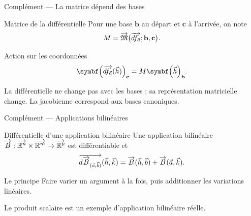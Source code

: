 \begin{frame}[t]{Complément — La matrice dépend des bases}
\coursanalyse
\begin{notion}{Matrice de la différentielle}
Pour une base $\mathbf b$ au départ et $\mathbf c$ à l'arrivée, on note
\[M=\overrightarrow{\mathfrak M}\bigl(\overrightarrow{df_{\vec a}};\mathbf b,\mathbf c\bigr).\]
\end{notion}
\begin{theoreme}{Action sur les coordonnées}
\[\coord{\df f{\vec a}(\vec h)}{\mathbf c}=M\coord{\vec h}{\mathbf b}.\]
\end{theoreme}
\vfill La différentielle ne change pas avec les bases ; sa représentation matricielle change. La jacobienne correspond aux bases canoniques.
\end{frame}

\begin{frame}[t]{Complément — Applications bilinéaires}
\coursanalyse
\begin{theoreme}{Différentielle d'une application bilinéaire}
Une application bilinéaire $\overrightarrow{B}:\overrightarrow{\mathbb R^{n}}\times\overrightarrow{\mathbb R^{m}}\to\overrightarrow{\mathbb R^{p}}$ est différentiable et
\[\overrightarrow{d\overrightarrow{B}_{(\vec a,\vec b)}}(\vec h,\vec k)=\overrightarrow{B}(\vec h,\vec b)+\overrightarrow{B}(\vec a,\vec k).\]
\end{theoreme}
\begin{resultat}{Le principe}
Faire varier un argument à la fois, puis additionner les variations linéaires.
\end{resultat}
\vfill Le produit scalaire est un exemple d'application bilinéaire réelle.
\end{frame}
